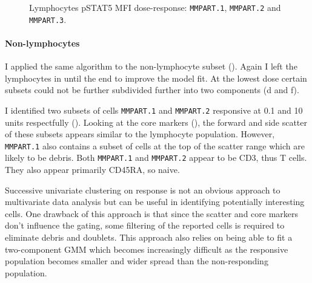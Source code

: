 \begin{figure}
\begin{minipage}{.5\textwidth}
\end{minipage}
\begin{minipage}{.3\textwidth}
{ Lymphocytes pSTAT5 MFI dose-response: \texttt{MMPART.1}, \texttt{MMPART.2} and \texttt{MMPART.3}. }
{ }
\end{minipage}
\end{figure}

\clearpage


\paragraph{Non-lymphocytes}

I applied the same algorithm to the non-lymphocyte subset ().
Again I left the lymphocytes in until the end to improve the model fit.
At the lowest dose certain subsets could not be further subdivided further into two components (d and f).

I identified two subsets of cells \texttt{MMPART.1} and \texttt{MMPART.2} responsive at 0.1 and 10 units respectfully ().
Looking at the core markers (), the forward and side scatter of these subsets appears similar to the lymphocyte population.
However, \texttt{MMPART.1} also contains a subset of cells at the top of the scatter range which are likely to be debris.
Both \texttt{MMPART.1} and \texttt{MMPART.2} appear to be CD3\positive, thus T cells.
They also appear primarily CD45RA\negative, so naive.

Successive univariate clustering on response is not an obvious approach to multivariate data analysis but can be useful in identifying potentially interesting cells.
One drawback of this approach is that since the scatter and core markers don't influence the gating, some filtering of the reported cells is required to eliminate
debris and doublets.
This approach also relies on being able to fit a two-component \gls{GMM} which becomes increasingly difficult as the responsive population becomes smaller and wider
spread than the non-responding population.


